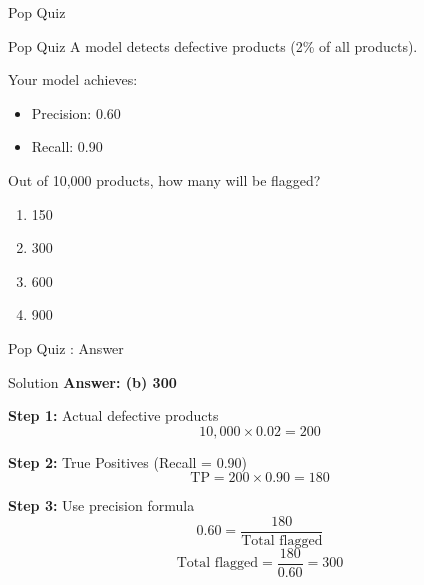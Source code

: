 \documentclass{beamer}
\newcounter{popquiz}
\begin{document}
\begin{frame}{Pop Quiz \thepopquiz}
\begin{popquizbox}{Pop Quiz \thepopquiz}
A model detects defective products (2\% of all products).

\vspace{0.2cm}

Your model achieves:
\begin{itemize}
    \item Precision: 0.60
    \item Recall: 0.90
\end{itemize}

\vspace{0.2cm}

Out of 10,000 products, how many will be flagged?
\end{popquizbox}

\vspace{0.3cm}

\begin{enumerate}
    \item 150
    \item 300
    \item 600
    \item 900
\end{enumerate}
\end{frame}

\begin{frame}{Pop Quiz \thepopquiz: Answer}
\begin{examplebox}{Solution}
\textbf{Answer: (b) 300}
\end{examplebox}

\vspace{0.3cm}

\textbf{Step 1:} Actual defective products
$$10{,}000 \times 0.02 = 200$$

\textbf{Step 2:} True Positives (Recall = 0.90)
$$\text{TP} = 200 \times 0.90 = 180$$

\textbf{Step 3:} Use precision formula
$$0.60 = \frac{180}{\text{Total flagged}}$$
$$\text{Total flagged} = \frac{180}{0.60} = 300$$
\end{frame}
\end{document}
